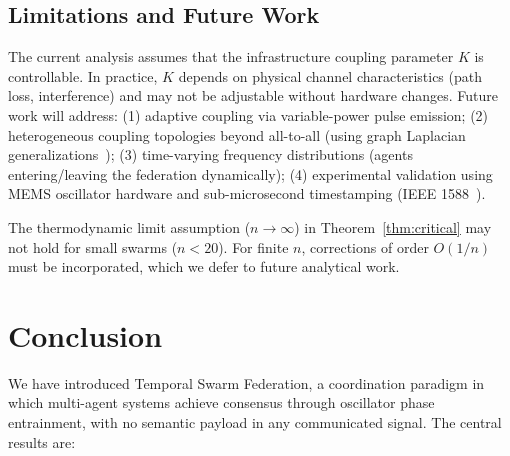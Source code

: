 \documentclass[twocolumn,10pt]{article}
\begin{document}
\subsection{Limitations and Future Work}

The current analysis assumes that the infrastructure coupling parameter $K$
is controllable. In practice, $K$ depends on physical channel characteristics
(path loss, interference) and may not be adjustable without hardware changes.
Future work will address:
(1) adaptive coupling via variable-power pulse emission;
(2) heterogeneous coupling topologies beyond all-to-all (using graph
    Laplacian generalizations~\cite{OlfatiSaber2004});
(3) time-varying frequency distributions (agents entering/leaving the
    federation dynamically);
(4) experimental validation using MEMS oscillator hardware and sub-microsecond
    timestamping (IEEE 1588~\cite{IEEE1588-2019}).

The thermodynamic limit assumption ($n \to \infty$) in Theorem~\ref{thm:critical}
may not hold for small swarms ($n < 20$). For finite $n$, corrections of order
$O(1/n)$ must be incorporated, which we defer to future analytical work.

\section{Conclusion}
\label{sec:conclusion}

We have introduced Temporal Swarm Federation, a coordination paradigm in which
multi-agent systems achieve consensus through oscillator phase entrainment,
with no semantic payload in any communicated signal. The central results are:
\end{document}
